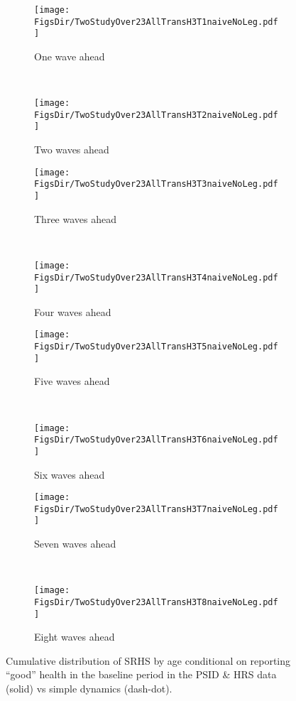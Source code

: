 \documentclass[12pt,pdftex,letterpaper]{article}
\newcommand{\RootDir}{..}
\newcommand{\FigsDir}{\RootDir/Figures}
\begin{document}
\begin{figure}
	\centering
	\begin{subfigure}[b]{0.45\textwidth}
		\texttt{[image: \\FigsDir/TwoStudyOver23AllTransH3T1naiveNoLeg.pdf]}
		\caption{One wave ahead}\label{fig:Naive1AheadGood}
	\end{subfigure}
	~
	\begin{subfigure}[b]{0.45\textwidth}
		\texttt{[image: \\FigsDir/TwoStudyOver23AllTransH3T2naiveNoLeg.pdf]}
		\caption{Two waves ahead}\label{fig:Naive2AheadGood}
	\end{subfigure}
	
	\begin{subfigure}[b]{0.45\textwidth}
		\texttt{[image: \\FigsDir/TwoStudyOver23AllTransH3T3naiveNoLeg.pdf]}
		\caption{Three waves ahead}\label{fig:Naive3AheadGood}
	\end{subfigure}
	~
	\begin{subfigure}[b]{0.45\textwidth}
		\texttt{[image: \\FigsDir/TwoStudyOver23AllTransH3T4naiveNoLeg.pdf]}
		\caption{Four waves ahead}\label{fig:Naive4AheadGood}
	\end{subfigure}
	
	\begin{subfigure}[b]{0.45\textwidth}
		\texttt{[image: \\FigsDir/TwoStudyOver23AllTransH3T5naiveNoLeg.pdf]}
		\caption{Five waves ahead}\label{fig:Naive5AheadGood}
	\end{subfigure}
	~
	\begin{subfigure}[b]{0.45\textwidth}
		\texttt{[image: \\FigsDir/TwoStudyOver23AllTransH3T6naiveNoLeg.pdf]}
		\caption{Six waves ahead}\label{fig:Naive6AheadGood}
	\end{subfigure}
	
	\begin{subfigure}[b]{0.45\textwidth}
		\texttt{[image: \\FigsDir/TwoStudyOver23AllTransH3T7naiveNoLeg.pdf]}
		\caption{Seven waves ahead}\label{fig:Naive7AheadGood}
	\end{subfigure}
	~
	\begin{subfigure}[b]{0.45\textwidth}
		\texttt{[image: \\FigsDir/TwoStudyOver23AllTransH3T8naiveNoLeg.pdf]}
		\caption{Eight waves ahead}\label{fig:Naive8AheadGood}
	\end{subfigure}
	\caption{Cumulative distribution of SRHS by age conditional on reporting ``good'' health in the baseline period in the PSID \& HRS data (solid) vs simple dynamics (dash-dot).}\label{fig:NaiveTransGD}
\end{figure}
\end{document}
